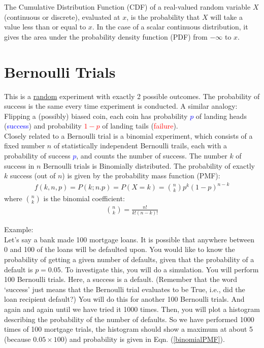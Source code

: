 The Cumulative Distribution Function (CDF) of a real-valued random variable $X$ (continuous or discrete), evaluated at $x$, is the probability that $X$ will take a value less than or equal to $x$. In the case of a scalar continuous distribution, it gives the area under the probability density function (PDF) from $-\infty$ to $x$.

\section{Bernoulli Trials}

This is a \underline{random} experiment with exactly 2 possible outcomes. The probability of success is the same every time experiment is conducted. A similar analogy: Flipping a (possibly) biased coin, each coin has probability \textcolor{blue}{$p$} of landing heads (\textcolor{blue}{success}) and probability \textcolor{red}{$1 - p$} of landing tails (\textcolor{red}{failure}).  \\

Closely related to a Bernoulli trial is a binomial experiment, which consists of a fixed number $n$ of statistically independent Bernoulli trails, each with a probability of success \textcolor{blue}{$p$}, and counts the number of success. The number $k$ of success in $n$ Bernoulli trials is Binomially distributed. The probability of exactly $k$ success (out of $n$) is given by the probability mass function (PMF): 
\begin{eqnarray}
f(k,n,p) = P(k; n.p) =  P(X = k) = \binom{n}{k} p^k (1-p)^{n-k}
\label{binomialPMF}
\end{eqnarray}
where $\binom{n}{k}$ is the binomial coefficient:
\begin{eqnarray}
\binom{n}{k} = \frac{n !}{k! (n-k)!}
\label{binomialcoef}
\end{eqnarray}

Example:\\
Let's say a bank made 100 mortgage loans. It is possible that anywhere between 0 and 100 of the loans will be defaulted upon. You would like to know the probability of getting a given number of defaults, given that the probability of a default is $p = 0.05$. To investigate this, you will do a simulation. You will perform 100 Bernoulli trials. Here, a success is a default. (Remember that the word `success' just means that the Bernoulli trial evaluates to be True, i.e., did the loan recipient default?) You will do this for another 100 Bernoulli trials. And again and again until we have tried it 1000 times. Then, you will plot a histogram describing the probability of the number of defaults. So we have performed 1000 times of 100 mortgage trials, the histogram should show a maximum at about 5 (because $0.05 \times 100$) and probability is given in Eqn. (\ref{binomialPMF}). \\   

